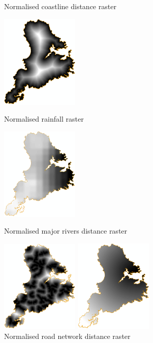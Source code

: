 \documentclass{article}
\begin{document}
\begin{figure}[h]
  \centering
  \begin{minipage}[b]{0.4\textwidth}
    \centering
    \caption{Normalised coastline distance raster}
    \includegraphics[width=140px]{images/part3/final_criteria/criterion_coast.PNG}
  \end{minipage}
  \hfill
  \begin{minipage}[b]{0.4\textwidth}
    \centering
    \caption{Normalised rainfall raster}
    \includegraphics[width=140px]{images/part3/final_criteria/criterion_rain.PNG}
  \end{minipage}

  \vspace{1cm}

  \begin{minipage}[b]{0.4\textwidth}
    \centering
    \caption{Normalised major rivers distance raster}
    \includegraphics[width=140px]{images/part3/final_criteria/criterion_rivers.PNG}
  \end{minipage}
  \hfill
  \begin{minipage}[b]{0.4\textwidth}
    \centering
    \caption{Normalised road network distance raster}
    \includegraphics[width=140px]{images/part3/final_criteria/criterion_roads.PNG}
  \end{minipage}


\end{figure}
\end{document}
